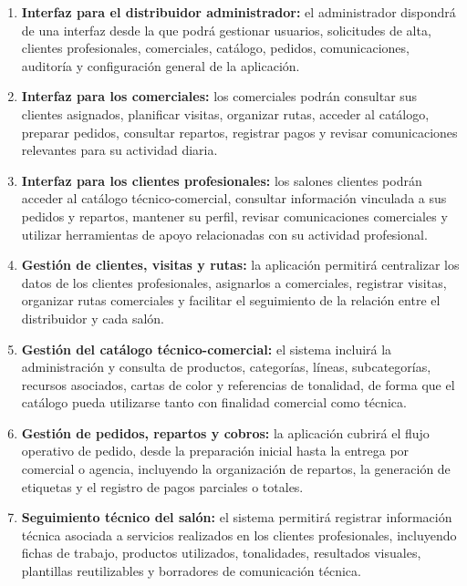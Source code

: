 \begin{enumerate}
    \item \textbf{Interfaz para el distribuidor administrador:} el administrador dispondrá de una interfaz desde la que podrá gestionar usuarios, solicitudes de alta, clientes profesionales, comerciales, catálogo, pedidos, comunicaciones, auditoría y configuración general de la aplicación.

    \item \textbf{Interfaz para los comerciales:} los comerciales podrán consultar sus clientes asignados, planificar visitas, organizar rutas, acceder al catálogo, preparar pedidos, consultar repartos, registrar pagos y revisar comunicaciones relevantes para su actividad diaria.

    \item \textbf{Interfaz para los clientes profesionales:} los salones clientes podrán acceder al catálogo técnico-comercial, consultar información vinculada a sus pedidos y repartos, mantener su perfil, revisar comunicaciones comerciales y utilizar herramientas de apoyo relacionadas con su actividad profesional.

    \item \textbf{Gestión de clientes, visitas y rutas:} la aplicación permitirá centralizar los datos de los clientes profesionales, asignarlos a comerciales, registrar visitas, organizar rutas comerciales y facilitar el seguimiento de la relación entre el distribuidor y cada salón.

    \item \textbf{Gestión del catálogo técnico-comercial:} el sistema incluirá la administración y consulta de productos, categorías, líneas, subcategorías, recursos asociados, cartas de color y referencias de tonalidad, de forma que el catálogo pueda utilizarse tanto con finalidad comercial como técnica.

    \item \textbf{Gestión de pedidos, repartos y cobros:} la aplicación cubrirá el flujo operativo de pedido, desde la preparación inicial hasta la entrega por comercial o agencia, incluyendo la organización de repartos, la generación de etiquetas y el registro de pagos parciales o totales.

    \item \textbf{Seguimiento técnico del salón:} el sistema permitirá registrar información técnica asociada a servicios realizados en los clientes profesionales, incluyendo fichas de trabajo, productos utilizados, tonalidades, resultados visuales, plantillas reutilizables y borradores de comunicación técnica.


\end{enumerate}
